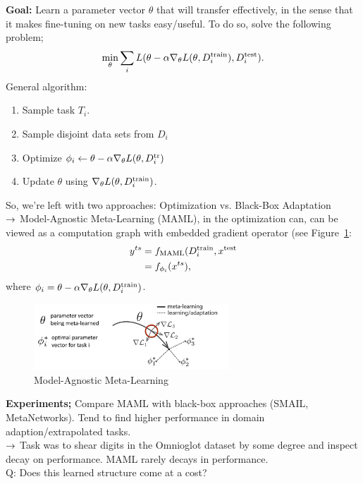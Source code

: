 {\bf Goal:} Learn a parameter vector $\theta$ that will transfer effectively, in the sense that it makes fine-tuning on new tasks easy/useful. To do so, solve the following problem;
\[
\min_\theta \sum_i L(\theta - \alpha \nabla_\theta L(\theta, D_i^{\text{train}}), D_i^{\text{test}}).
\]
General algorithm:
\begin{enumerate}
\item Sample task $T_i$.
\item Sample disjoint data sets from $D_i$
\item Optimize $\phi_i \leftarrow \theta - \alpha \nabla_\theta L(\theta, D_i^{\text{tr}})$
\item Update $\theta$ using $\nabla_\theta L(\theta, D_i^{\text{train}})$.
\end{enumerate}

So, we're left with two approaches: Optimization vs. Black-Box Adaptation \\

$\rightarrow$ Model-Agnostic Meta-Learning (MAML), in the optimization can, can be viewed as a computation graph with embedded gradient operator (see Figure~\ref{fig:maml}:
\begin{align}
 y^{ts} &= f_{\text{MAML}}(D_i^{\text{train}}, x^{\text{test}} \\
 &= f_{\phi_i}(x^{ts}),
\end{align}
where $\phi_i = \theta - \alpha \nabla_\theta L(\theta, D_i^{\text{train}})$.

\begin{figure}
    \centering
    \includegraphics[width=0.65\textwidth]{images/maml.JPG}
    \caption{Model-Agnostic Meta-Learning}
    \label{fig:maml}
\end{figure}


{\bf Experiments;} Compare MAML with black-box approaches (SMAIL, MetaNetworks). Tend to find higher performance in domain adaption/extrapolated tasks. \\
$\rightarrow$ Task was to shear digits in the Omnioglot dataset by some degree and inspect decay on performance. MAML rarely decays in performance. \\

Q: Does this learned structure come at a cost? \\

